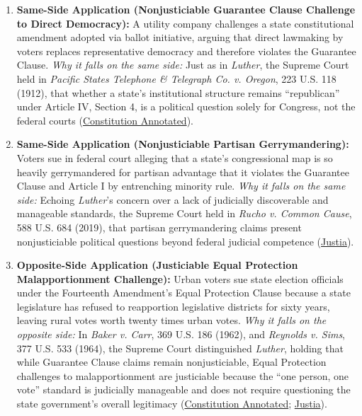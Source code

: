 \documentclass[12pt]{article}
\begin{document}
\begin{enumerate}
\item \textbf{Same-Side Application (Nonjusticiable Guarantee Clause Challenge to Direct Democracy):} A utility company challenges a state constitutional amendment adopted via ballot initiative, arguing that direct lawmaking by voters replaces representative democracy and therefore violates the Guarantee Clause. \textit{Why it falls on the same side:} Just as in \textit{Luther}, the Supreme Court held in \textit{Pacific States Telephone \& Telegraph Co. v. Oregon}, 223 U.S. 118 (1912), that whether a state's institutional structure remains ``republican'' under Article IV, Section 4, is a political question solely for Congress, not the federal courts (\href{https://www.law.cornell.edu/constitution-conan/article-3/section-2/clause-1/luther-v-borden-and-the-guarantee-clause}{Constitution Annotated}).

\item \textbf{Same-Side Application (Nonjusticiable Partisan Gerrymandering):} Voters sue in federal court alleging that a state's congressional map is so heavily gerrymandered for partisan advantage that it violates the Guarantee Clause and Article I by entrenching minority rule. \textit{Why it falls on the same side:} Echoing \textit{Luther}'s concern over a lack of judicially discoverable and manageable standards, the Supreme Court held in \textit{Rucho v. Common Cause}, 588 U.S. 684 (2019), that partisan gerrymandering claims present nonjusticiable political questions beyond federal judicial competence (\href{https://supreme.justia.com/cases/federal/us/588/18-422/}{Justia}).

\item \textbf{Opposite-Side Application (Justiciable Equal Protection Malapportionment Challenge):} Urban voters sue state election officials under the Fourteenth Amendment's Equal Protection Clause because a state legislature has refused to reapportion legislative districts for sixty years, leaving rural votes worth twenty times urban votes. \textit{Why it falls on the opposite side:} In \textit{Baker v. Carr}, 369 U.S. 186 (1962), and \textit{Reynolds v. Sims}, 377 U.S. 533 (1964), the Supreme Court distinguished \textit{Luther}, holding that while Guarantee Clause claims remain nonjusticiable, Equal Protection challenges to malapportionment are justiciable because the ``one person, one vote'' standard is judicially manageable and does not require questioning the state government's overall legitimacy (\href{https://www.law.cornell.edu/constitution-conan/article-3/section-2/clause-1/luther-v-borden-and-the-guarantee-clause}{Constitution Annotated}; \href{https://supreme.justia.com/cases/federal/us/377/533/}{Justia}).


\end{enumerate}
\end{document}
